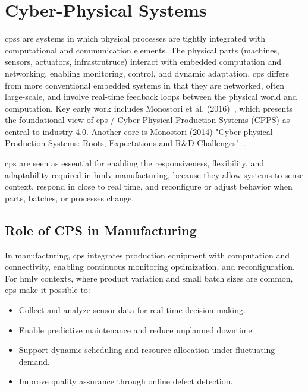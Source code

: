 \section{Cyber-Physical Systems}\label{sec:cps}

\ac{cps}s are systems in which physical processes are tightly integrated with computational and communication elements.
The physical parts (machines, sensors, actuators, infrastrutruce) interact with embedded computation and networking, enabling monitoring, control, and dynamic adaptation.
\ac{cps} differs from more conventional embedded systems in that they are networked, often large-scale, and involve real-time feedback loops between the physical world and computation.
Key early work includes Monostori et al. (2016)~\cite{monsori-cps-in-manufacturing}, which presents the foundational view of \ac{cps} / Cyber-Physical Production Systems (CPPS) as central to industry 4.0.
Another core is Monostori (2014) "Cyber-physical Production Systems: Roots, Expectations and R\&D Challenges"~\cite{monsori-cpps-roots-expectations-rnd-challenges}.

\ac{cps} are seen as essential for enabling the responsiveness, flexibility, and adaptability required in \ac{hmlv} manufacturing, because they allow systems to sense context, respond in close to real time, and reconfigure or adjust behavior when parts, batches, or processes change.

\subsection{Role of CPS in Manufacturing}

In manufacturing, \ac{cps} integrates production equipment with computation and connectivity, enabling continuous monitoring optimization, and reconfiguration.
For \ac{hmlv} contexts, where product variation and small batch sizes are common, \ac{cps} make it possible to:

\begin{itemize}
    \item Collect and analyze sensor data for real-time decision making.
    \item Enable predictive maintenance and reduce unplanned downtime.
    \item Support dynamic scheduling and resource allocation under fluctuating demand.
    \item Improve quality assurance through online defect detection.
\end{itemize}


